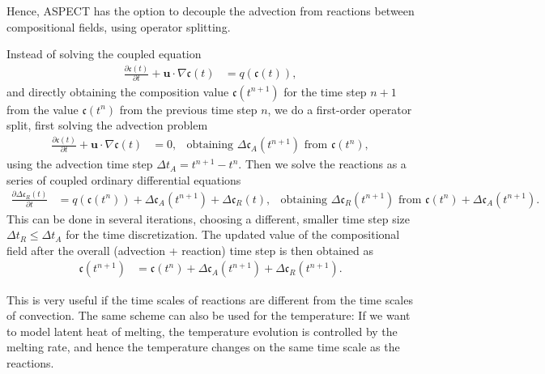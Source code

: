\documentclass{article}
\newcommand{\aspect}{\textsc{ASPECT}}
\begin{document}
Hence, \aspect{} has the option to decouple the advection from reactions between compositional fields, using operator splitting.

Instead of solving the coupled equation
\begin{align}
  \frac{\partial \mathfrak{c}(t)}{\partial t} + \mathbf u\cdot\nabla \mathfrak{c}(t)
  &=
  q(\mathfrak{c}(t)),
\end{align}
and directly obtaining the composition value $\mathfrak{c}(t^{n+1})$ for the time step $n+1$ from the value $\mathfrak{c}(t^{n})$ from the previous time step $n$, we do a first-order operator split, first solving the advection problem
\begin{align}
  \frac{\partial \mathfrak{c}(t)}{\partial t} + \mathbf u\cdot\nabla \mathfrak{c}(t)
  &=
  0,
  &
  \text{obtaining } \Delta \mathfrak{c}_A(t^{n+1}) \text{ from } \mathfrak{c}(t^{n}),
\end{align}
using the advection time step $\Delta t_A = t^{n+1} - t^{n}$.
Then we solve the reactions as a series of coupled ordinary differential equations 
\begin{align}
  \frac{\partial \Delta \mathfrak{c}_R(t)}{\partial t} 
  &=
  q(\mathfrak{c}(t^n))+\Delta \mathfrak{c}_A(t^{n+1})+\Delta \mathfrak{c}_R(t),
  &
  \text{obtaining } \Delta \mathfrak{c}_R(t^{n+1}) \text{ from } \mathfrak{c}(t^n)+\Delta \mathfrak{c}_A(t^{n+1}).
\end{align}
This can be done in several iterations, choosing a different, smaller time step size $\Delta t_R \leq \Delta t_A$ for the time discretization. 
The updated value of the compositional field after the overall (advection + reaction) time step is then obtained as
\begin{align}
  \mathfrak{c}(t^{n+1}) 
  &=
  \mathfrak{c}(t^{n}) + \Delta \mathfrak{c}_A(t^{n+1})+\Delta \mathfrak{c}_R(t^{n+1}).
\end{align}

This is very useful if the time scales of reactions are different from the time scales of convection. 
The same scheme can also be used for the temperature: If we want to model latent heat of melting, the temperature evolution is controlled by the melting rate, and hence the temperature changes on the same time scale as the reactions. 
\end{document}
